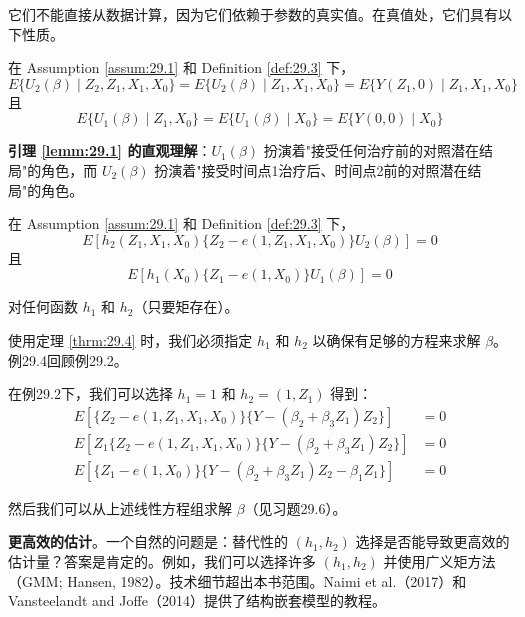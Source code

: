 它们不能直接从数据计算，因为它们依赖于参数的真实值。在真值处，它们具有以下性质。

\begin{Lemma}[引理 29.1]\label{lemm:29.1}
在 Assumption \ref{assum:29.1} 和 Definition \ref{def:29.3} 下，
\[
E\{U_2(\beta) \mid Z_2, Z_1, X_1, X_0\} = E\{U_2(\beta) \mid Z_1, X_1, X_0\} = E\{Y(Z_1, 0) \mid Z_1, X_1, X_0\}
\tag{29.30}
\]
且
\[
E\{U_1(\beta) \mid Z_1, X_0\} = E\{U_1(\beta) \mid X_0\} = E\{Y(0, 0) \mid X_0\}
\tag{29.31}
\]
\end{Lemma}

\textbf{引理 \ref{lemm:29.1} 的直观理解}：$U_1(\beta)$ 扮演着"接受任何治疗前的对照潜在结局"的角色，而 $U_2(\beta)$ 扮演着"接受时间点1治疗后、时间点2前的对照潜在结局"的角色。

\begin{Theorem}\label{thrm:29.4}
在 Assumption \ref{assum:29.1} 和 Definition \ref{def:29.3} 下，
\[
E\left[ h_2(Z_1, X_1, X_0) \{ Z_2 - e(1, Z_1, X_1, X_0) \} U_2(\beta) \right] = 0
\tag{29.32}
\]
且
\[
E\left[ h_1(X_0) \{ Z_1 - e(1, X_0) \} U_1(\beta) \right] = 0
\tag{29.33}
\]

对任何函数 $h_1$ 和 $h_2$（只要矩存在）。
\end{Theorem}

使用定理 \ref{thrm:29.4} 时，我们必须指定 $h_1$ 和 $h_2$ 以确保有足够的方程来求解 $\beta$。例29.4回顾例29.2。

\begin{Example}[例29.4 — 例29.2下的估计方程]\label{ex:29.4}
在例29.2下，我们可以选择 $h_1 = 1$ 和 $h_2 = (1, Z_1)$ 得到：
\[
\begin{aligned}
E[\{Z_2 - e(1, Z_1, X_1, X_0)\} \{Y - (\beta_2 + \beta_3 Z_1) Z_2\}] & = 0 \\
E[Z_1 \{Z_2 - e(1, Z_1, X_1, X_0)\} \{Y - (\beta_2 + \beta_3 Z_1) Z_2\}] & = 0 \\
E[\{Z_1 - e(1, X_0)\} \{Y - (\beta_2 + \beta_3 Z_1) Z_2 - \beta_1 Z_1\}] & = 0
\end{aligned}
\tag{29.34}
\]

然后我们可以从上述线性方程组求解 $\beta$（见习题29.6）。
\end{Example}

\textbf{更高效的估计}。一个自然的问题是：替代性的 $(h_1, h_2)$ 选择是否能导致更高效的估计量？答案是肯定的。例如，我们可以选择许多 $(h_1, h_2)$ 并使用广义矩方法（GMM; Hansen, 1982）。技术细节超出本书范围。Naimi et al.（2017）和 Vansteelandt and Joffe（2014）提供了结构嵌套模型的教程。

